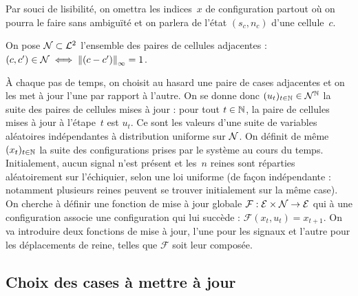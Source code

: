 Par souci de lisibilité, on omettra les indices~$x$ de configuration partout où on pourra le faire sans ambiguïté et on parlera de l'état $(s_c, n_c)$ d'une cellule~$c$.

On pose $\mathcal{N} \subset \mathcal{L}^2$ l'ensemble des paires de cellules adjacentes : $(c, c') \in \mathcal{N} \iff \left\lVert(c-c')\right\rVert_\infty = 1$.

À chaque pas de temps, on choisit au hasard une paire de cases adjacentes et on les met à jour l'une par rapport à l'autre.
On se donne donc $(u_t)_{t\in\mathbb{N}} \in \mathcal{N}^{\mathbb{N}}$ la suite des paires de cellules mises à jour : pour tout $t\in\mathbb{N}$, la paire de cellules mises à jour à l'étape~$t$ est $u_t$. Ce sont les valeurs d'une suite de variables aléatoires indépendantes à distribution uniforme sur $\mathcal{N}$. On définit de même $(x_t)_{t\in\mathbb{N}}$ la suite des configurations prises par le système au cours du temps. Initialement, aucun signal n'est présent et les~$n$ reines sont réparties aléatoirement sur l'échiquier, selon une loi uniforme (de façon indépendante : notamment plusieurs reines peuvent se trouver initialement sur la même case). 
On cherche à définir une fonction de mise à jour globale $\mathcal{F} : {\mathcal{E}\times\mathcal{N}}\to\mathcal{E}$ qui à une configuration associe une configuration qui lui succède : \mbox{$\mathcal{F}(x_t, u_t) = x_{t+1}$}.
On va introduire deux fonctions de mise à jour, l'une pour les signaux et l'autre pour les déplacements de reine, telles que $\mathcal{F}$ soit leur composée.

 
\subsection{Choix des cases à mettre à jour}

